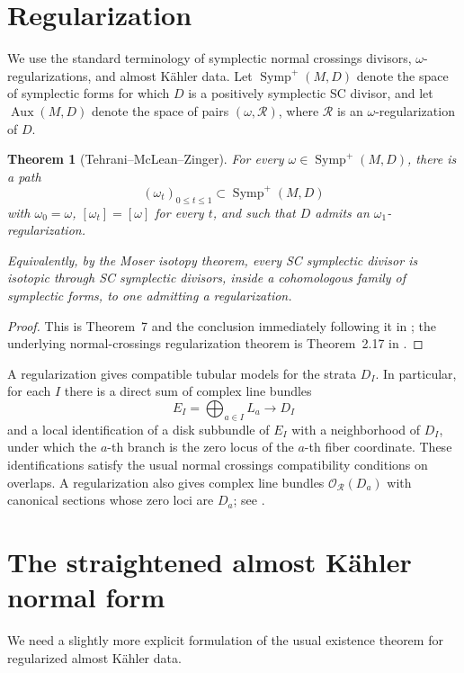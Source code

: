 \documentclass[11pt]{article}
\newtheorem{theorem}{Theorem}[section]
\theoremstyle{definition}
\theoremstyle{remark}
\newcommand{\Symp}{\operatorname{Symp}}
\newcommand{\Aux}{\operatorname{Aux}}
\begin{document}
\section{Regularization}

We use the standard terminology of symplectic normal crossings divisors,
\(\omega\)-regularizations, and almost K\"ahler data. Let
\(\Symp^+(M,D)\) denote the space of symplectic forms for which \(D\) is a
positively symplectic SC divisor, and let \(\Aux(M,D)\) denote the space of
pairs \((\omega,\mathcal R)\), where \(\mathcal R\) is an
\(\omega\)-regularization of \(D\).

\begin{theorem}[Tehrani--McLean--Zinger]\label{thm:TMZ}
For every \(\omega\in\Symp^+(M,D)\), there is a path
\[
(\omega_t)_{0\leq t\leq1}\subset\Symp^+(M,D)
\]
with \(\omega_0=\omega\), \([\omega_t]=[\omega]\) for every \(t\), and such that
\(D\) admits an \(\omega_1\)-regularization.

Equivalently, by the Moser isotopy theorem, every SC symplectic divisor is
isotopic through SC symplectic divisors, inside a cohomologous family of
symplectic forms, to one admitting a regularization.
\end{theorem}

\begin{proof}
This is Theorem~7 and the conclusion immediately following it in
\cite{TMZ-CR}; the underlying normal-crossings regularization theorem is
Theorem~2.17 in \cite{TMZ-structures}.
\end{proof}

A regularization gives compatible tubular models for the strata \(D_I\). In
particular, for each \(I\) there is a direct sum of complex line bundles
\[
E_I=\bigoplus_{a\in I}L_a\longrightarrow D_I
\]
and a local identification of a disk subbundle of \(E_I\) with a neighborhood
of \(D_I\), under which the \(a\)-th branch is the zero locus of the
\(a\)-th fiber coordinate. These identifications satisfy the usual normal
crossings compatibility conditions on overlaps. A regularization also gives
complex line bundles \(\mathcal O_{\mathcal R}(D_a)\) with canonical sections
whose zero loci are \(D_a\); see \cite[Proposition~1.1 and \S2]{TMZ-structures}.

\section{The straightened almost K\"ahler normal form}

We need a slightly more explicit formulation of the usual existence theorem for
regularized almost K\"ahler data.
\end{document}
